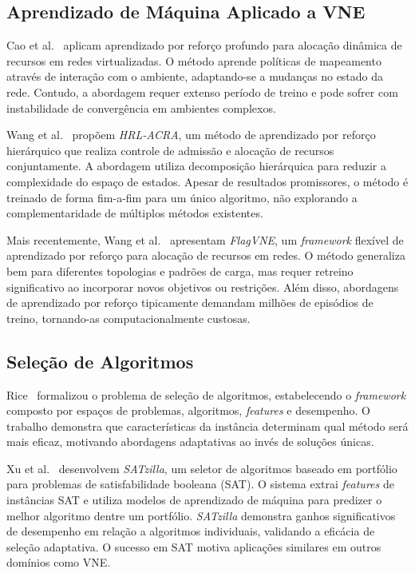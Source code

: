 \documentclass[conference]{IEEEtran}
\begin{document}
\subsection{Aprendizado de Máquina Aplicado a VNE}

Cao et al.~\cite{cao2018nfv-deeprl} aplicam aprendizado por reforço profundo para alocação dinâmica de recursos em redes virtualizadas. O método aprende políticas de mapeamento através de interação com o ambiente, adaptando-se a mudanças no estado da rede. Contudo, a abordagem requer extenso período de treino e pode sofrer com instabilidade de convergência em ambientes complexos.

Wang et al.~\cite{tsc-2023-hrl-acra} propõem \textit{HRL-ACRA}, um método de aprendizado por reforço hierárquico que realiza controle de admissão e alocação de recursos conjuntamente. A abordagem utiliza decomposição hierárquica para reduzir a complexidade do espaço de estados. Apesar de resultados promissores, o método é treinado de forma fim-a-fim para um único algoritmo, não explorando a complementaridade de múltiplos métodos existentes.

Mais recentemente, Wang et al.~\cite{ijcai-2024-flagvne} apresentam \textit{FlagVNE}, um \textit{framework} flexível de aprendizado por reforço para alocação de recursos em redes. O método generaliza bem para diferentes topologias e padrões de carga, mas requer retreino significativo ao incorporar novos objetivos ou restrições. Além disso, abordagens de aprendizado por reforço tipicamente demandam milhões de episódios de treino, tornando-as computacionalmente custosas.

\subsection{Seleção de Algoritmos}

Rice~\cite{rice1976algorithm} formalizou o problema de seleção de algoritmos, estabelecendo o \textit{framework} composto por espaços de problemas, algoritmos, \textit{features} e desempenho. O trabalho demonstra que características da instância determinam qual método será mais eficaz, motivando abordagens adaptativas ao invés de soluções únicas.

Xu et al.~\cite{xu2012satzilla} desenvolvem \textit{SATzilla}, um seletor de algoritmos baseado em portfólio para problemas de satisfabilidade booleana (SAT). O sistema extrai \textit{features} de instâncias SAT e utiliza modelos de aprendizado de máquina para predizer o melhor algoritmo dentre um portfólio. \textit{SATzilla} demonstra ganhos significativos de desempenho em relação a algoritmos individuais, validando a eficácia de seleção adaptativa. O sucesso em SAT motiva aplicações similares em outros domínios como VNE.
\end{document}
